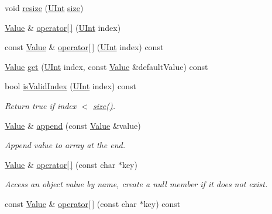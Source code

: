 \begin{DoxyCompactItemize}
\item 
void \hyperlink{classJson_1_1Value_a9ac3948baaa27f9f7bbf65fa8301484f}{resize} (\hyperlink{classJson_1_1Value_a0933d59b45793ae4aade1757c322a98d}{U\-Int} \hyperlink{classJson_1_1Value_a69d4f979237e19aabef12de56c18c38f}{size})
\item 
\hyperlink{classJson_1_1Value}{Value} \& \hyperlink{classJson_1_1Value_a83267de2c43047529d90f35ced020ba9}{operator\mbox{[}$\,$\mbox{]}} (\hyperlink{classJson_1_1Value_a0933d59b45793ae4aade1757c322a98d}{U\-Int} index)
\item 
const \hyperlink{classJson_1_1Value}{Value} \& \hyperlink{classJson_1_1Value_a90d15ba05ca251568567e165529af8a3}{operator\mbox{[}$\,$\mbox{]}} (\hyperlink{classJson_1_1Value_a0933d59b45793ae4aade1757c322a98d}{U\-Int} index) const 
\item 
\hyperlink{classJson_1_1Value}{Value} \hyperlink{classJson_1_1Value_aff2e3a2e9fd5db5469588ab7b501d4db}{get} (\hyperlink{classJson_1_1Value_a0933d59b45793ae4aade1757c322a98d}{U\-Int} index, const \hyperlink{classJson_1_1Value}{Value} \&default\-Value) const 
\item 
bool \hyperlink{classJson_1_1Value_a193dd42bf77a7a704971e6de07656367}{is\-Valid\-Index} (\hyperlink{classJson_1_1Value_a0933d59b45793ae4aade1757c322a98d}{U\-Int} index) const 
\begin{DoxyCompactList}\small\item\em Return true if index $<$ \hyperlink{classJson_1_1Value_a69d4f979237e19aabef12de56c18c38f}{size()}. \end{DoxyCompactList}\item 
\hyperlink{classJson_1_1Value}{Value} \& \hyperlink{classJson_1_1Value_a3b7c0ef3bb1958cafdf10483e93ed711}{append} (const \hyperlink{classJson_1_1Value}{Value} \&value)
\begin{DoxyCompactList}\small\item\em Append value to array at the end. \end{DoxyCompactList}\item 
\hyperlink{classJson_1_1Value}{Value} \& \hyperlink{classJson_1_1Value_aa744825e8edd61f538fa7e718f876dcc}{operator\mbox{[}$\,$\mbox{]}} (const char $\ast$key)
\begin{DoxyCompactList}\small\item\em Access an object value by name, create a null member if it does not exist. \end{DoxyCompactList}\item 
const \hyperlink{classJson_1_1Value}{Value} \& \hyperlink{classJson_1_1Value_ace2579a4be99b4741df38a736f16d5ad}{operator\mbox{[}$\,$\mbox{]}} (const char $\ast$key) const 

\end{DoxyCompactItemize}
